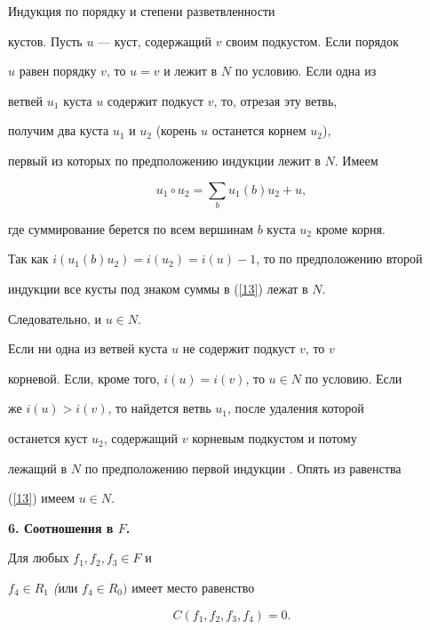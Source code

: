 \begin{pf} Индукция по порядку и степени разветвленности


кустов. Пусть $u$ --- куст, содержащий $v$ своим подкустом. Если порядок


$u$ равен порядку $v$, то $u=v$ и лежит в $N$ по условию. Если одна из


ветвей $u_1$ куста $u$ содержит подкуст $v$, то, отрезая эту ветвь,


получим два куста $u_1$ и $u_2$ (корень $u$ останется корнем $u_2$),


первый из которых по предположению индукции лежит в $N$. Имеем


\begin{equation}\label{13}


u_1 \circ u_2 = \sum _b u_1(b)u_2 + u,


\end{equation}


где суммирование берется по всем вершинам $b$ куста $u_2$ кроме корня.


Так как $i(u_1(b)u_2)=i(u_2)=i(u)-1$, то по предположению второй


индукции все кусты под знаком суммы в (\ref{13}) лежат в $N$.


Следовательно, и $u \in N$.





Если ни одна из ветвей куста $u$ не содержит подкуст $v$, то $v$


корневой. Если, кроме того, $i(u)=i(v)$, то $u \in N$ по условию. Если


же $i(u)>i(v)$, то найдется ветвь $u_1$, после удаления которой


останется куст $u_2$, содержащий $v$ корневым подкустом и потому


лежащий в $N$ по предположению первой индукции . Опять из равенства


(\ref{13}) имеем $u \in N$.


\end{pf}





{\bf 6. Соотношения в $F$.}





\begin{prop} Для любых $f_1, f_2, f_3 \in F$ и


$f_4 \in R_1$ {\em (}или $f_4 \in R_0)$ имеет место равенство


\begin{equation}\label{14}


C(f_1,f_2,f_3,f_4)=0.


\end{equation}


\end{prop}





